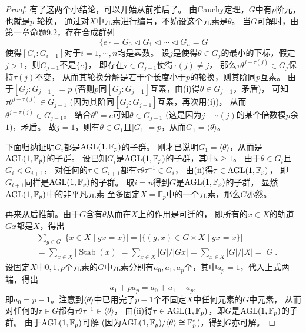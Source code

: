 \begin{enumerate}
\begin{proof}
    有了这两个小结论，可以开始从前推后了。
    由Cauchy定理，$G$中有$p$阶元，也就是$p$-轮换，
    通过对$X$中元素进行编号，不妨设这个元素是$\theta$。
    当$G$可解时，由第一章命题9.2，存在合成群列
    \[\{e\}=G_0 \triangleleft G_1 \triangleleft\cdots\triangleleft G_n=G\]
    使得$[G_i:G_{i-1}]$对于$i=1,\cdots,n$均是素数。
    设$j$是使得$\theta \in G_j$的最小的下标，假定$j>1$，则$G_{j-1}$不是$\{e\}$，
    即存在$\tau \in G_{j-1}$使得$\tau(j) \ne j$，
    那么$\tau\theta^{j-\tau(j)} \in G_j$保持$\tau(j)$不变，
    从而其轮换分解是若干个长度小于$p$的轮换，则其阶同$p$互素。
    由于$[G_j:G_{j-1}]=p$ (否则$p$同$[G_j:G_{j-1}]$互素，由(i)得$\theta \in G_{j-1}$，矛盾)，
    可知$\tau\theta^{j-\tau(j)} \in G_{j-1}$ (因为其阶同$[G_j:G_{j-1}]$互素，再次用(i))，
    从而$\theta^{j-\tau(j)} \in G_{j-1}$。
    结合$\theta^p=e$可知$\theta \in G_{j-1}$ (这是因为$j-\tau(j)$的某个倍数模$p$余$1$)，矛盾。
    故$j=1$，则有$\theta \in G_1$且$|G_1|=p$，从而$G_1=\langle\theta\rangle$。
    
    下面归纳证明$G_i$都是${\rm AGL}(1,\mathbb{F}_p)$的子群。
    刚才已说明$G_1=\langle\theta\rangle$，从而是${\rm AGL}(1,\mathbb{F}_p)$的子群。
    设已知$G_i$是${\rm AGL}(1,\mathbb{F}_p)$的子群，其中$i\geqslant1$。
    由于$\theta \in G_i$且$G_i \triangleleft G_{i+1}$，
    对任何的$\tau \in G_{i+1}$都有$\tau\theta\tau^{-1} \in G_i$，
    由(ii)得$\tau\in{\rm AGL}(1,\mathbb{F}_p)$，
    即$G_{i+1}$同样是${\rm AGL}(1,\mathbb{F}_p)$的子群。
    取$i=n$得到$G$是${\rm AGL}(1,\mathbb{F}_p)$的子群，
    显然${\rm AGL}(1,\mathbb{F}_p)$中的非平凡元素
    至多固定$X=\mathbb{F}_p$中的一个元素，那么$G$亦然。
    
    再来从后推前。由于$G$含有$\theta$从而在$X$上的作用是可迁的，
    即所有的$x \in X$的轨道$Gx$都是$X$，得出
    \begin{align*}
        &\sum_{g \in G}|\{x \in X \mid gx=x\}|=|\{(g,x) \in G \times X \mid gx=x\}|\\
        &=\sum_{x \in X}|\operatorname{Stab}(x)|=\sum_{x \in X}|G|/|Gx|=\sum_{x \in X}|G|/|X|=|G|.
    \end{align*}
    设固定$X$中$0,1,p$个元素的$G$中元素分别有$a_0,a_1,a_p$个，其中$a_p=1$，代入上式两端，得出
    \[a_1+pa_p=a_0+a_1+a_p,\]
    即$a_0=p-1$。注意到$\langle\theta\rangle$中已用完了$p-1$个不固定$X$中任何元素的$G$中元素，
    从而对任何的$\tau \in G$都有$\tau\theta\tau^{-1}\in\langle\theta\rangle$，
    由(ii)得$\tau\in{\rm AGL}(1,\mathbb{F}_p)$，即$G$是${\rm AGL}(1,\mathbb{F}_p)$的子群。
    由于${\rm AGL}(1,\mathbb{F}_p)$可解 (因为${\rm AGL}(1,\mathbb{F}_p)/\langle\theta\rangle\cong\mathbb{F}_p^*$)，得到$G$亦可解。
\end{proof}
\end{enumerate}

